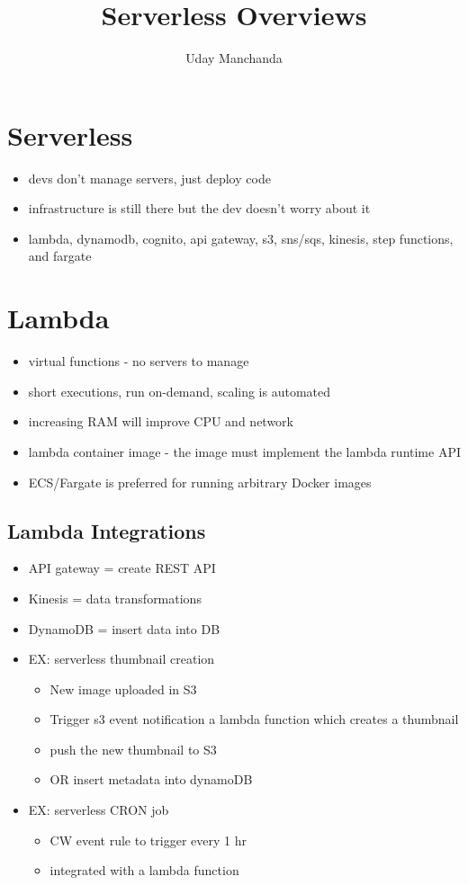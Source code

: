 \documentclass[]{scrartcl}
\title{Serverless Overviews}
\author{Uday Manchanda}
\begin{document}
\maketitle

\section{Serverless}
\begin{itemize}
	\item devs don't manage servers, just deploy code
	\item infrastructure is still there but the dev doesn't worry about it
	\item lambda, dynamodb, cognito, api gateway, s3, sns/sqs, kinesis, step functions, and fargate
\end{itemize}

\section{Lambda}
\begin{itemize}
	\item virtual functions - no servers to manage
	\item short executions, run on-demand, scaling is automated
	\item increasing RAM will improve CPU and network
	\item lambda container image - the image must implement the lambda runtime API
	\item ECS/Fargate is preferred for running arbitrary Docker images
\end{itemize}

\subsection{Lambda Integrations}
\begin{itemize}
	\item API gateway = create REST API
	\item Kinesis = data transformations
	\item DynamoDB = insert data into DB
	\item EX: serverless thumbnail creation
	\begin{itemize}
		\item New image uploaded in S3
		\item Trigger s3 event notification a lambda function which creates a thumbnail
		\item push the new thumbnail to S3
		\item OR insert metadata into dynamoDB
	\end{itemize}
	\item EX: serverless CRON job
	\begin{itemize}
		\item CW event rule to trigger every 1 hr
		\item integrated with a lambda function
	\end{itemize}
\end{itemize}
\end{document}
